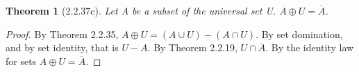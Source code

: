 \documentclass[a4paper, 12pt]{article}
\theoremstyle{plain}
\newtheorem*{theorem*}{Theorem}
\begin{document}
	
	\begin{theorem*}[2.2.37c]
		Let A be a subset of the universal set U. $A \oplus U = \overline{A}$.
	\end{theorem*}
	
	\begin{proof}
		By Theorem 2.2.35, $A \oplus U = (A \cup U) - (A \cap U)$. By set domination, and by set identity, that is $U - A$. By Theorem 2.2.19, $U \cap \overline{A}$. By the identity law for sets $A \oplus U = \overline{A}$.
	\end{proof}
\end{document}
